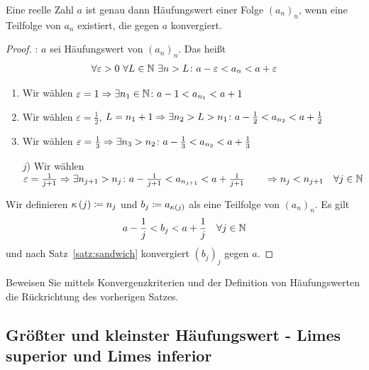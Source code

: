 \begin{satz}
    \label{satz:haeufungswert-teilfolge}
    Eine reelle Zahl $a$ ist genau dann Häufungswert einer Folge $(a_n)_n$, wenn eine Teilfolge von $a_n$ existiert, die gegen $a$ konvergiert.

    \begin{proof}
        \anf{$\impl$}: $a$ sei Häufungswert von $(a_n)_n$. Das heißt
        \begin{align*}
            \forall \varepsilon > 0~\forall L\in\mathbb{N}~\exists n>L\colon a-\varepsilon < a_n < a+\varepsilon
        \end{align*}
        \begin{enumerate}[label=\arabic*)]
            \item Wir wählen $\varepsilon = 1 \Rightarrow{} \exists n_1\in\mathbb{N}\colon a-1 < a_{n_1} < a+1$
            \item Wir wählen $\varepsilon = \frac{1}{2}$, $L=n_1 + 1 \Rightarrow{} \exists n_2 > L > n_1\colon a-\frac{1}{2} < a_{n_2} < a + \frac{1}{2}$
            \item Wir wählen $\varepsilon = \frac{1}{3} \Rightarrow{} \exists n_3 > n_2\colon a - \frac{1}{3} < a_{n_3} < a + \frac{1}{3}$
            \item[$j$)] Wir wählen $\varepsilon = \frac{1}{j+1} \Rightarrow{} \exists n_{j+1} > n_j\colon a-\frac{1}{j+1} < a_{n_{j+1}} < a + \frac{1}{j+1}\qquad \Rightarrow{} n_j < n_{j+1}\quad\forall j \in \mathbb{N}$
        \end{enumerate}
        \noindent Wir definieren $\kappa\left(j\right) \coloneqq n_j$ und $b_j \coloneqq a_{\kappa(j)}$ als eine Teilfolge von $(a_n)_n$. Es gilt
        \begin{align*}
            a-\frac{1}{j} < b_j < a + \frac{1}{j}\quad\forall j\in\mathbb{N}
        \end{align*}
        und nach Satz~\ref{satz:sandwich} konvergiert $(b_j)_j$ gegen $a$.\qedhere
    \end{proof}
    \begin{uebung}
        Beweisen Sie mittels Konvergenzkriterien und der Definition von Häufungswerten die Rückrichtung des vorherigen Satzes.
    \end{uebung}
\end{satz}

\newpage


\subsection{Größter und kleinster Häufungswert - Limes superior und Limes inferior}
\marginnote{[28. Nov]}


